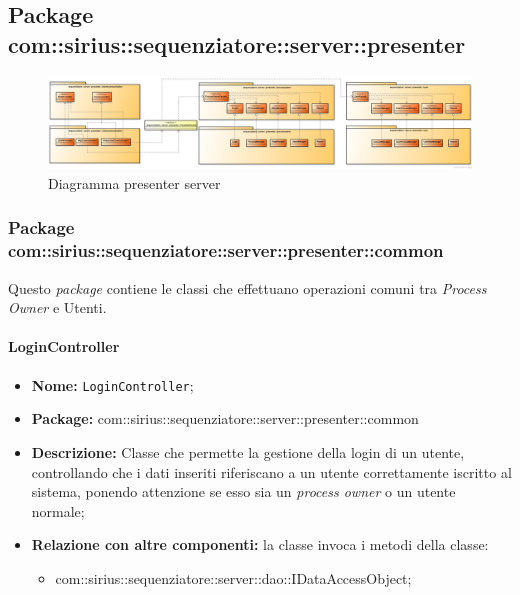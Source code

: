 \subsection{Package com::sirius::sequenziatore::server::presenter}
\begin{figure}[H] \centering \includegraphics[width=%
\textwidth]
{./pack/ClassiServerSoloPresenter.png} \caption{Diagramma presenter server}
\end{figure}
\subsubsection{Package com::sirius::sequenziatore::server::presenter::common}
Questo \textit{package} contiene le classi che effettuano operazioni comuni tra \textit{Process Owner} e Utenti.
\paragraph{LoginController}
	\begin{itemize}
		\item \textbf{Nome:} \texttt{LoginController};
		\item \textbf{Package:} com::sirius::sequenziatore::server::presenter::common
		\item \textbf{Descrizione:} Classe che permette la gestione della login di un utente, controllando che i dati inseriti riferiscano a un utente correttamente iscritto al sistema, ponendo attenzione se esso sia un \textit{process owner} o un utente normale;
		\item \textbf{Relazione con altre componenti:} la classe invoca i metodi della classe:
		\begin{itemize}
			\item com::sirius::sequenziatore::server::dao::IDataAccessObject;
		\end{itemize}
	\end{itemize}
	

